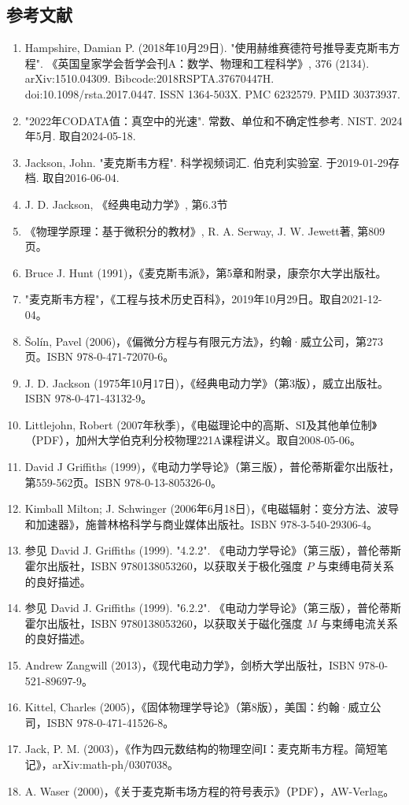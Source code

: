 \subsection{参考文献}
\begin{enumerate}
\item Hampshire, Damian P. (2018年10月29日). "使用赫维赛德符号推导麦克斯韦方程". 《英国皇家学会哲学会刊A：数学、物理和工程科学》, 376 (2134). arXiv:1510.04309. Bibcode:2018RSPTA.37670447H. doi:10.1098/rsta.2017.0447. ISSN 1364-503X. PMC 6232579. PMID 30373937.
\item "2022年CODATA值：真空中的光速". 常数、单位和不确定性参考. NIST. 2024年5月. 取自2024-05-18.
\item Jackson, John. "麦克斯韦方程". 科学视频词汇. 伯克利实验室. 于2019-01-29存档. 取自2016-06-04.
\item J. D. Jackson, 《经典电动力学》, 第6.3节
\item 《物理学原理：基于微积分的教材》, R. A. Serway, J. W. Jewett著, 第809页。
\item Bruce J. Hunt (1991)，《麦克斯韦派》，第5章和附录，康奈尔大学出版社。
\item "麦克斯韦方程"，《工程与技术历史百科》，2019年10月29日。取自2021-12-04。
\item Šolín, Pavel (2006)，《偏微分方程与有限元方法》，约翰·威立公司，第273页。ISBN 978-0-471-72070-6。
\item J. D. Jackson (1975年10月17日)，《经典电动力学》（第3版），威立出版社。ISBN 978-0-471-43132-9。
\item Littlejohn, Robert (2007年秋季)，《电磁理论中的高斯、SI及其他单位制》（PDF），加州大学伯克利分校物理221A课程讲义。取自2008-05-06。
\item David J Griffiths (1999)，《电动力学导论》（第三版），普伦蒂斯霍尔出版社，第559-562页。ISBN 978-0-13-805326-0。
\item Kimball Milton; J. Schwinger (2006年6月18日)，《电磁辐射：变分方法、波导和加速器》，施普林格科学与商业媒体出版社。ISBN 978-3-540-29306-4。
\item 参见 David J. Griffiths (1999). "4.2.2". 《电动力学导论》（第三版），普伦蒂斯霍尔出版社，ISBN 9780138053260，以获取关于极化强度 \(P\) 与束缚电荷关系的良好描述。
\item 参见 David J. Griffiths (1999). "6.2.2". 《电动力学导论》（第三版），普伦蒂斯霍尔出版社，ISBN 9780138053260，以获取关于磁化强度 \(M\) 与束缚电流关系的良好描述。
\item Andrew Zangwill (2013)，《现代电动力学》，剑桥大学出版社，ISBN 978-0-521-89697-9。
\item Kittel, Charles (2005)，《固体物理学导论》（第8版），美国：约翰·威立公司，ISBN 978-0-471-41526-8。
\item Jack, P. M. (2003)，《作为四元数结构的物理空间I：麦克斯韦方程。简短笔记》，arXiv:math-ph/0307038。
\item A. Waser (2000)，《关于麦克斯韦场方程的符号表示》（PDF），AW-Verlag。
\end{enumerate}